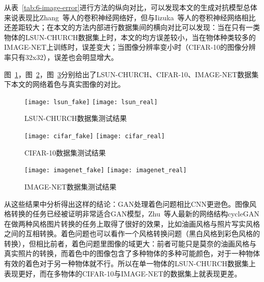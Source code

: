   从表~\ref{tab:6-image-error}进行方法的纵向对比，可以发现本文的生成对抗模型总体来说表现比Zhang~\cite{zhang2016colorful}等人的卷积神经网络好，但与Iizuka~\cite{IizukaSIGGRAPH2016}等人的卷积神经网络相比还差距较大；在本文的方法内部进行数据集间的横向对比可以发现：当在只有一类物体的LSUN-CHURCH数据集上时，本文的均方误差较小，当在物体种类较多的IMAGE-NET上训练时，误差变大；当图像分辨率变小时（CIFAR-10的图像分辨率只有32x32），误差也会明显增大。

  图~\ref{fig:lsun-compare}，图~\ref{fig:cifar-compare}，图~\ref{fig:imagenet-compare}分别给出了LSUN-CHURCH、CIFAR-10、IMAGE-NET数据集下本文的网络着色与真实图像的对比。

  \begin{figure}[ht]
    \centering
      {\texttt{[image: lsun\_fake]}}
    \hspace{2em}
        {\texttt{[image: lsun\_real]}}
    \caption{LSUN-CHURCH数据集测试结果}
    \label{fig:lsun-compare}
  \end{figure}

  \begin{figure}[ht]
    \centering
      {\texttt{[image: cifar\_fake]}}
    \hspace{2em}
        {\texttt{[image: cifar\_real]}}
    \caption{CIFAR-10数据集测试结果}
    \label{fig:cifar-compare}
  \end{figure}

  \begin{figure}[ht]
    \centering
      {\texttt{[image: imagenet\_fake]}}
    \hspace{2em}
        {\texttt{[image: imagenet\_real]}}
    \caption{IMAGE-NET数据集测试结果}
    \label{fig:imagenet-compare}
  \end{figure}

  从这些结果中分析得出这样的结论：GAN处理着色问题相比CNN更逊色。图像风格转换的任务已经被证明非常适合GAN模型，Zhu~\cite{DBLP:journals/corr/ZhuPIE17}等人最新的网络结构cycleGAN在做两种风格图片转换的任务上取得了很好的效果，比如油画风格与照片写实风格之间的互相转换。着色问题也可以看作一个风格转换问题（黑白风格到彩色风格的转换），但相比前者，着色问题里图像的域更大：前者可能只是莫奈的油画风格与真实照片的转换，而着色中的图像包含了多种物体的多种可能颜色，对于一种物体有效的着色对于另一种物体就不行。所以在单一物体的LSUN-CHURCH数据集上表现更好，而在多物体的CIFAR-10与IMAGE-NET的数据集上就表现更差。

